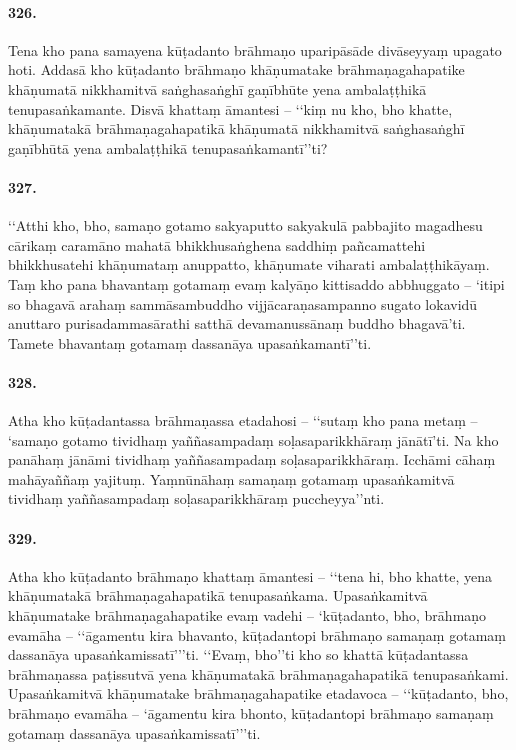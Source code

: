 \paragraph{326.} Tena kho pana samayena kūṭadanto brāhmaṇo uparipāsāde divāseyyaṃ upagato hoti. Addasā kho kūṭadanto brāhmaṇo khāṇumatake brāhmaṇagahapatike khāṇumatā nikkhamitvā saṅghasaṅghī gaṇībhūte yena ambalaṭṭhikā tenupasaṅkamante. Disvā khattaṃ āmantesi – ‘‘kiṃ nu kho, bho khatte, khāṇumatakā brāhmaṇagahapatikā khāṇumatā nikkhamitvā saṅghasaṅghī gaṇībhūtā yena ambalaṭṭhikā tenupasaṅkamantī’’ti?

\paragraph{327.} ‘‘Atthi kho, bho, samaṇo gotamo sakyaputto sakyakulā pabbajito magadhesu cārikaṃ caramāno mahatā bhikkhusaṅghena saddhiṃ pañcamattehi bhikkhusatehi khāṇumataṃ anuppatto, khāṇumate viharati ambalaṭṭhikāyaṃ. Taṃ kho pana bhavantaṃ gotamaṃ evaṃ kalyāṇo kittisaddo abbhuggato – ‘itipi so bhagavā arahaṃ sammāsambuddho vijjācaraṇasampanno sugato lokavidū anuttaro purisadammasārathi satthā devamanussānaṃ buddho bhagavā’ti. Tamete bhavantaṃ gotamaṃ dassanāya upasaṅkamantī’’ti.

\paragraph{328.} Atha kho kūṭadantassa brāhmaṇassa etadahosi – ‘‘sutaṃ kho pana metaṃ – ‘samaṇo gotamo tividhaṃ yaññasampadaṃ soḷasaparikkhāraṃ jānātī’ti. Na kho panāhaṃ jānāmi tividhaṃ yaññasampadaṃ soḷasaparikkhāraṃ. Icchāmi cāhaṃ mahāyaññaṃ yajituṃ. Yaṃnūnāhaṃ samaṇaṃ gotamaṃ upasaṅkamitvā tividhaṃ yaññasampadaṃ soḷasaparikkhāraṃ puccheyya’’nti.

\paragraph{329.} Atha kho kūṭadanto brāhmaṇo khattaṃ āmantesi – ‘‘tena hi, bho khatte, yena khāṇumatakā brāhmaṇagahapatikā tenupasaṅkama. Upasaṅkamitvā khāṇumatake brāhmaṇagahapatike evaṃ vadehi – ‘kūṭadanto, bho, brāhmaṇo evamāha – ‘‘āgamentu kira bhavanto, kūṭadantopi brāhmaṇo samaṇaṃ gotamaṃ dassanāya upasaṅkamissatī’’’ti. ‘‘Evaṃ, bho’’ti kho so khattā kūṭadantassa brāhmaṇassa paṭissutvā yena khāṇumatakā brāhmaṇagahapatikā tenupasaṅkami. Upasaṅkamitvā khāṇumatake brāhmaṇagahapatike etadavoca – ‘‘kūṭadanto, bho, brāhmaṇo evamāha – ‘āgamentu kira bhonto, kūṭadantopi brāhmaṇo samaṇaṃ gotamaṃ dassanāya upasaṅkamissatī’’’ti.

